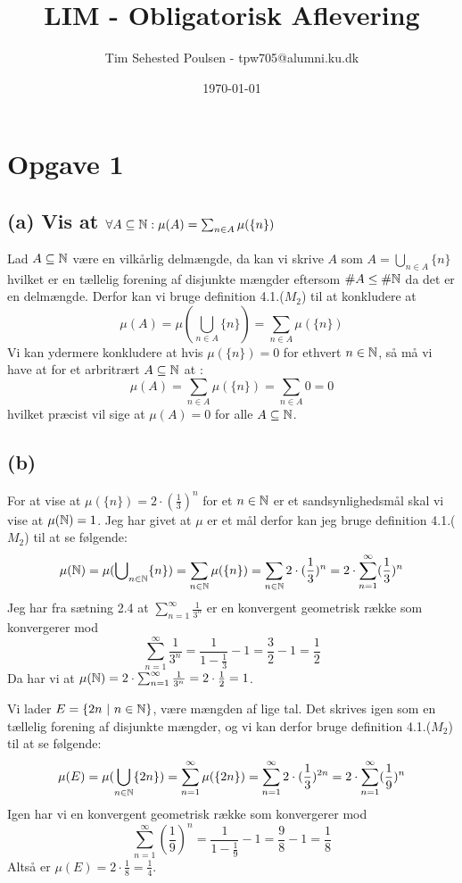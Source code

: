 \documentclass{article}
\title{\textbf{LIM - Obligatorisk Aflevering}}
\author{Tim Sehested Poulsen - tpw705@alumni.ku.dk}
\date\today
\begin{document}
\maketitle %
\section*{Opgave 1}
\subsection*{(a) Vis at $\forall A \subseteq \mathbb{N} : \mu(A) = \sum_{n \in A} \mu( \{ n \} )$}
Lad $A \subseteq \mathbb{N}$ være en vilkårlig delmængde, da kan vi skrive $A$ 
som $A = {\bigcup}_{n \in A} \{n\}$ hvilket er en tællelig forening af disjunkte mængder eftersom
$\#A \le \#\mathbb{N}$ da det er en delmængde.
Derfor kan vi bruge definition 4.1.($M_2$) \cite{lim} til at konkludere at 
\[
    \mu(A) = \mu( {\bigcup}_{n \in A} \{n\} ) = \sum_{n \in A} \mu( \{n\} )
\]
Vi kan ydermere konkludere at hvis $\mu(\{n\}) = 0$ for ethvert $n \in \mathbb{N}$, så må vi have at
for et arbritrært $A \subseteq \mathbb{N}$ at :
\[
    \mu(A) = \sum_{n \in A} \mu( \{ n \} ) = \sum_{n \in A} 0 = 0
\]
hvilket præcist vil sige at $\mu(A) = 0$ for alle $A \subseteq \mathbb{N}$.

\subsection*{(b)}
For at vise at $\mu(\{n\}) = 2 \cdot (\frac{1}{3})^{n}$ for et $n \in \mathbb{N}$ 
er et sandsynlighedsmål skal vi vise at $\mu(\mathbb{N}) = 1$. Jeg har givet at $\mu$ er et mål
derfor kan jeg bruge definition 4.1.($M_2$) \cite{lim} 
til at se følgende:
\[
    \mu(\mathbb{N}) = \mu( {\bigcup}_{n \in \mathbb{N}} \{n\} ) = \sum_{n \in \mathbb{N}} \mu( \{n\} ) 
    = \sum_{n \in \mathbb{N}} 2 \cdot (\frac{1}{3})^{n} = 2 \cdot \sum_{n = 1}^{\infty} (\frac{1}{3})^{n}
\]
Jeg har fra sætning 2.4 \cite{an1} at $\sum_{n=1}^{\infty} \frac{1}{3^n}$ er en konvergent geometrisk række
som konvergerer mod 
\[
    \sum_{n=1}^{\infty} \frac{1}{3^n} = \frac{1}{1-\frac{1}{3}} - 1 = \frac{3}{2} - 1 = \frac{1}{2}
\]
Da har vi at $\mu(\mathbb{N}) = 2 \cdot \sum_{n=1}^{\infty} \frac{1}{3^n} = 2 \cdot \frac{1}{2} = 1$.

Vi lader $E = \{2n \text{ } | \text{ } n \in \mathbb{N} \}$, være mængden af lige tal.
Det skrives igen som en tællelig forening af disjunkte mængder, og vi kan derfor bruge
definition 4.1.($M_2$) \cite{lim} til at se følgende:
\[
    \mu(E) = \mu(\bigcup_{n \in \mathbb{N}} \{2n\}) = \sum_{n=1}^{\infty} \mu(\{ 2n \})
    = \sum_{n=1}^{\infty} 2 \cdot (\frac{1}{3})^{2n} = 2 \cdot \sum_{n=1}^{\infty} (\frac{1}{9})^{n}
\]
Igen har vi en konvergent geometrisk række som konvergerer mod
\[
    \sum_{n=1}^{\infty} (\frac{1}{9})^{n} = \frac{1}{1-\frac{1}{9}} - 1 = \frac{9}{8} - 1 = \frac{1}{8}
\]
Altså er $\mu(E) = 2 \cdot \frac{1}{8} = \frac{1}{4}$.
\end{document}
